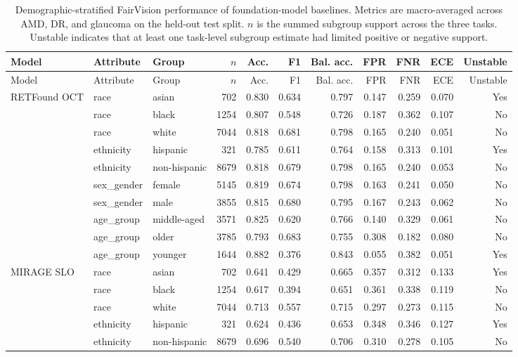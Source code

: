 \begin{longtable}{@{}lllrrrrrrrr@{}}
\caption{Demographic-stratified FairVision performance of foundation-model baselines. Metrics are macro-averaged across AMD, DR, and glaucoma on the held-out test split. $n$ is the summed subgroup support across the three tasks. Unstable indicates that at least one task-level subgroup estimate had limited positive or negative support.}\label{tab:fairvision_foundation_demographic_detail}\\
\toprule
Model & Attribute & Group & $n$ & Acc. & F1 & Bal. acc. & FPR & FNR & ECE & Unstable \\
\midrule
\endfirsthead
\toprule
Model & Attribute & Group & $n$ & Acc. & F1 & Bal. acc. & FPR & FNR & ECE & Unstable \\
\midrule
\endhead
RETFound OCT & race & asian & 702 & 0.830 & 0.634 & 0.797 & 0.147 & 0.259 & 0.070 & Yes \\
 & race & black & 1254 & 0.807 & 0.548 & 0.726 & 0.187 & 0.362 & 0.107 & No \\
 & race & white & 7044 & 0.818 & 0.681 & 0.798 & 0.165 & 0.240 & 0.051 & No \\
 & ethnicity & hispanic & 321 & 0.785 & 0.611 & 0.764 & 0.158 & 0.313 & 0.101 & Yes \\
 & ethnicity & non-hispanic & 8679 & 0.818 & 0.679 & 0.798 & 0.165 & 0.240 & 0.053 & No \\
 & sex\_gender & female & 5145 & 0.819 & 0.674 & 0.798 & 0.163 & 0.241 & 0.050 & No \\
 & sex\_gender & male & 3855 & 0.815 & 0.680 & 0.795 & 0.167 & 0.243 & 0.062 & No \\
 & age\_group & middle-aged & 3571 & 0.825 & 0.620 & 0.766 & 0.140 & 0.329 & 0.061 & No \\
 & age\_group & older & 3785 & 0.793 & 0.683 & 0.755 & 0.308 & 0.182 & 0.080 & No \\
 & age\_group & younger & 1644 & 0.882 & 0.376 & 0.843 & 0.055 & 0.382 & 0.051 & Yes \\
MIRAGE SLO & race & asian & 702 & 0.641 & 0.429 & 0.665 & 0.357 & 0.312 & 0.133 & Yes \\
 & race & black & 1254 & 0.617 & 0.394 & 0.651 & 0.361 & 0.338 & 0.119 & No \\
 & race & white & 7044 & 0.713 & 0.557 & 0.715 & 0.297 & 0.273 & 0.115 & No \\
 & ethnicity & hispanic & 321 & 0.624 & 0.436 & 0.653 & 0.348 & 0.346 & 0.127 & Yes \\
 & ethnicity & non-hispanic & 8679 & 0.696 & 0.540 & 0.706 & 0.310 & 0.278 & 0.105 & No \\

\end{longtable}
